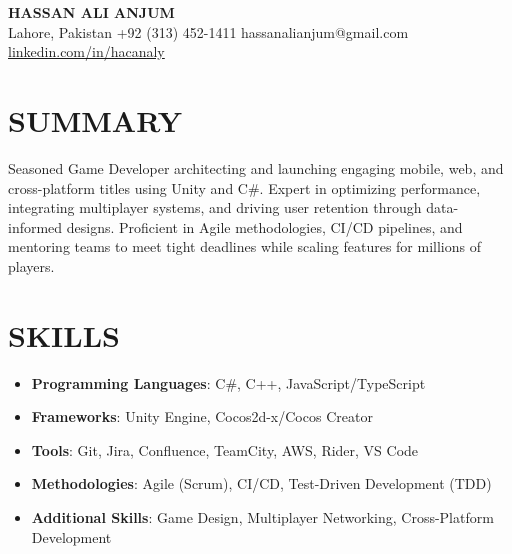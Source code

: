 \documentclass[11pt]{article}
\begin{document}
\begin{center}
    {\LARGE \textbf{HASSAN ALI ANJUM}} \\[6pt]
    Lahore, Pakistan \textbullet{} +92 (313) 452-1411 \textbullet{} hassanalianjum@gmail.com \textbullet{} \href{https://linkedin.com/in/hacanaly}{linkedin.com/in/hacanaly}
\end{center}

\section*{SUMMARY}
Seasoned Game Developer architecting and launching engaging mobile, web, and cross-platform titles using Unity and C\#. Expert in optimizing performance, integrating multiplayer systems, and driving user retention through data-informed designs. Proficient in Agile methodologies, CI/CD pipelines, and mentoring teams to meet tight deadlines while scaling features for millions of players.

\section*{SKILLS}
\begin{itemize}
    \item \textbf{Programming Languages}: C\#, C++, JavaScript/TypeScript
    \item \textbf{Frameworks}: Unity Engine, Cocos2d-x/Cocos Creator
    \item \textbf{Tools}: Git, Jira, Confluence, TeamCity, AWS, Rider, VS Code
    \item \textbf{Methodologies}: Agile (Scrum), CI/CD, Test-Driven Development (TDD)
    \item \textbf{Additional Skills}: Game Design, Multiplayer Networking, Cross-Platform Development
\end{itemize}

\end{document}

